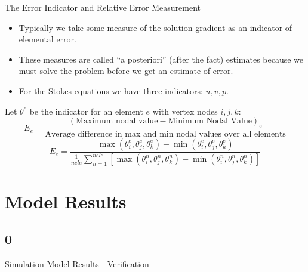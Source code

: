 \documentclass[compress]{beamer}
\begin{document}
\begin{frame}{The Error Indicator and Relative Error Measurement}
\begin{itemize}
\item Typically we take some measure of the solution gradient as an indicator of elemental error. 
\pause
\item These measures are called ``a posteriori'' (after the fact) estimates because we must solve the problem before we get an estimate of error. 
\pause
\item For the Stokes equations we have three indicators: $u,v,p$. 
\pause
\end{itemize}
Let $\theta^e$ be the indicator for an element $e$ with vertex nodes $i,j,k$:
\pause
$$E_e=\frac{(\mbox{Maximum nodal value} - \mbox{Minimum Nodal Value})_e}{\mbox{Average difference in max and min nodal values over all elements}}$$
$$E_e = \frac{\max\left(\theta^e_i,\theta^e_j,\theta^e_k\right)-\min\left(\theta^e_i,\theta^e_j,\theta^e_k\right)}{\frac{1}{nele}\sum^{nele}_{n=1}\left[\max\left(\theta^n_i,\theta^n_j,\theta^n_k\right)-\min\left(\theta^n_i,\theta^n_j,\theta^n_k\right)\right]}\label{eqn:err}$$
\end{frame}

\section{Model Results}
\subsection{0}
\begin{frame}{Simulation Model Results - Verification}
\pause
\begin{figure}
\end{figure}
\end{frame}
\setcounter{subfigure}{0}
\end{document}
